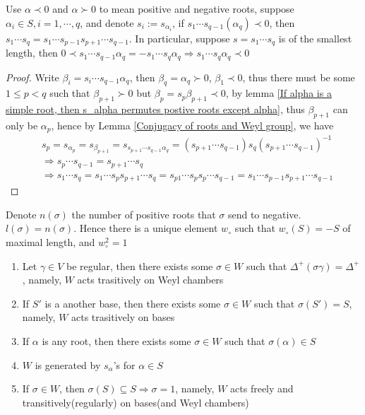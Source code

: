 \documentclass[main]{subfiles}
\begin{document}
\begin{lemma}\label{s=s1...sq is of minimal length => s1...sq(alpha_q) is a negative root}
Use $\alpha\prec0$ and $\alpha\succ0$ to mean positive and negative roots, suppose $\alpha_i\in S,i=1,\cdots,q$, and denote $s_i:=s_{\alpha_i}$, if $s_1\cdots s_{q-1}(\alpha_q)\prec0$, then $s_1\cdots s_{q}=s_1\cdots s_{p-1}s_{p+1}\cdots s_{q-1}$. In particular, suppose $s=s_1\cdots s_{q}$ is of the smallest length, then $0\prec s_1\cdots s_{q-1}\alpha_q=-s_1\cdots s_{q}\alpha_q\Rightarrow s_1\cdots s_{q}\alpha_q\prec0$
\end{lemma}

\begin{proof}
Write $\beta_i=s_{i}\cdots s_{q-1}\alpha_q$, then $\beta_{q}=\alpha_q\succ0$, $\beta_1\prec0$, thus there must be some $1\leq p<q$ such that $\beta_{p+1}\succ0$ but $\beta_{p}=s_{p}\beta_{p+1}\prec0$, by lemma \ref{If alpha is a simple root, then s_alpha permutes postive roots except alpha}, thus $\beta_{p+1}$ can only be $\alpha_{p}$, hence by Lemma \ref{Conjugacy of roots and Weyl group}, we have\begin{align*}
&s_{p}=s_{\alpha_{p}}=s_{\beta_{p+1}}=s_{s_{p+1}\cdots s_{q-1}\alpha_q}=(s_{p+1}\cdots s_{q-1})s_q(s_{p+1}\cdots s_{q-1})^{-1} \\&\Rightarrow s_{p}\cdots s_{q-1}=s_{p+1}\cdots s_{q} \\&\Rightarrow s_1\cdots s_q=s_{1}\cdots s_{p}s_{p+1}\cdots s_{q}=s_{p1}\cdots s_{p}s_{p}\cdots s_{q-1}=s_{1}\cdots s_{p-1}s_{p+1}\cdots s_{q-1}
\end{align*}
\end{proof}

\begin{lemma}
Denote $n(\sigma)$ the number of positive roots that $\sigma$ send to negative. $l(\sigma)=n(\sigma)$. Hence there is a unique element $w_\circ$ such that $w_\circ(S)=-S$ of maximal length, and $w_\circ^2=1$
\end{lemma}

\begin{theorem}\label{Some properties about Weyl group and Weyl chambers} \hfill
\begin{enumerate}[leftmargin=*,label=\textbf{(\alph*)}]
\item Let $\gamma\in V$ be regular, then there exists some $\sigma\in W$ such that $\Delta^+(\sigma\gamma)=\Delta^+$, namely, $W$ acts trasitively on Weyl chambers
\item If $S'$ is a another base, then there exists some $\sigma\in W$ such that $\sigma(S')=S$, namely, $W$ acts trasitively on bases
\item If $\alpha$ is any root, then there exists some $\sigma\in W$ such that $\sigma(\alpha)\in S$
\item $W$ is generated by $s_\alpha$'s for $\alpha\in S$
\item If $\sigma\in W$, then $\sigma(S)\subseteq S\Rightarrow\sigma=1$, namely, $W$ acts freely and transitively(regularly) on bases(and Weyl chambers)
\end{enumerate}
\end{theorem}
\end{document}
